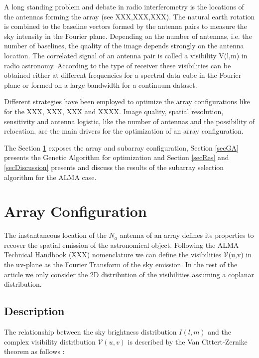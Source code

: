 \documentclass{aa}
\begin{document}
A long standing problem and debate  in radio interferometry is the locations of the antennas forming the array (see XXX,XXX,XXX). The natural earth rotation is combined to the
baseline vectors formed by the antenna pairs to measure the sky intensity in the Fourier plane. Depending on the number of antennas, i.e. the number of baselines, the quality
of the image depends strongly on the antenna location. The correlated signal of an antenna pair is called a visibility V(l,m) in radio astronomy. According to the type of
receiver these visibilities can be obtained either at different frequencies for a spectral data cube in the Fourier plane or formed on a large bandwidth for a continuum dataset.

Different strategies have been employed to optimize the  array configurations like for the XXX, XXX, XXX and XXXX. Image quality, spatial resolution, sensitivity and 
antenna logistic, like the number of antennas and  the possibility of relocation, are the main drivers for the optimization of an array configuration. 

The Section \ref{secAC} exposes the array and subarray configuration, Section \ref{secGA} presents the Genetic Algorithm for optimization and Section \ref{secRes} and \ref{secDiscussion} presents and discuss the results of the subarray selection algorithm for the ALMA case.


\section{Array Configuration}
\label{secAC}

The instantaneous location of the $N_a$ antenna of an array defines its properties to recover the spatial emission of the astronomical object. Following
the ALMA Technical Handbook (XXX) nomenclature we can define the visibilities $\mathcal{V}$(u,v) in the uv-plane as the Fourier Transform of the sky emission.
In the rest of the article we only consider the 2D distribution of the visibilities assuming a coplanar distribution.

\subsection{Description}

The relationship between the sky brightness distribution $I(l,m)$ and the complex visibility distribution $\mathcal{V}(u,v)$ is described by the Van Cittert-Zernike theorem as follows : 
	
\end{document}
